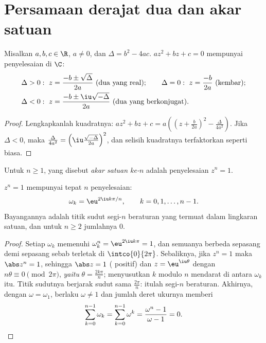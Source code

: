 \section{Persamaan derajat dua dan akar satuan}

\begin{theorem}\label{thm:g12:complex:quadratic}
Misalkan $a, b, c \in \R$, $a \neq 0$, dan $\Delta = b^2 - 4ac$. 
$az^2 + bz + c = 0$ mempunyai penyelesaian di $\C$:
\[
\begin{aligned}
&\Delta > 0:\ z = \frac{-b \pm \sqrt{\Delta}}{2a} \ (\text{dua yang real}); \qquad
\Delta = 0:\ z = \frac{-b}{2a} \ (\text{kembar}); \\
&\Delta < 0:\ z = \frac{-b \pm \iu\sqrt{-\Delta}}{2a} \ (\text{dua yang berkonjugat}).
\end{aligned}
\]
\end{theorem}

\begin{proof}
Lengkapkanlah kuadratnya:
$az^2 + bz + c = a\left(\left(z + \frac{b}{2a}\right)^2 -
\frac{\Delta}{4a^2}\right)$. Jika $\Delta < 0$, maka
$\frac{\Delta}{4a^2} = \left(\iu\frac{\sqrt{-\Delta}}{2a}\right)^2$, dan
selisih kuadratnya terfaktorkan seperti biasa.
\end{proof}

\begin{definition}\label{def:g12:complex:rootsofunity}
Untuk $n \geq 1$, yang disebut \emph{akar satuan ke-$n$} adalah
penyelesaian $z^n = 1$.
\end{definition}

\begin{theorem}\label{thm:g12:complex:rootsofunity}
 $z^n = 1$ mempunyai tepat $n$ penyelesaian:
\[
\omega_k = \eu^{2\iu k\pi/n}, \qquad k = 0, 1, \dots, n-1 .
\]
Bayangannya adalah titik sudut segi-$n$ beraturan yang termuat dalam lingkaran
satuan, dan untuk $n \geq 2$ jumlahnya $0$.
\end{theorem}

\begin{proof}
Setiap $\omega_k$ memenuhi $\omega_k^n = \eu^{2\iu k\pi} = 1$, dan semuanya
berbeda sepasang demi sepasang sebab  terletak di $\intco{0}{2\pi}$.
Sebaliknya, jika $z^n = 1$ maka $\abs z^n = 1$, sehingga $\abs z = 1$ ( positif) dan $z = \eu^{\iu\theta}$ dengan $n\theta \equiv 0 \pmod{2\pi}$,
\emph{yaitu} $\theta = \frac{2k\pi}{n}$; menyusutkan $k$ modulo $n$ mendarat di
antara $\omega_k$ itu. Titik sudutnya berjarak sudut sama $\frac{2\pi}{n}$:
itulah segi-$n$ beraturan. Akhirnya, dengan $\omega = \omega_1$,
berlaku $\omega \neq 1$ dan jumlah deret ukurnya memberi
\[
\sum_{k=0}^{n-1}\omega_k = \sum_{k=0}^{n-1}\omega^k
= \frac{\omega^n - 1}{\omega - 1} = 0 . \qedhere
\]
\end{proof}

